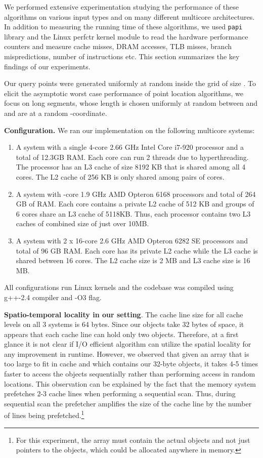 We performed extensive experimentation studying the performance of
these algorithms on various input types and on many different
multicore architectures. In addition to measuring the running time of
these algorithms, we used {\tt papi} library and the Linux perfctr kernel module to
read the hardware performance counters and measure cache misses, DRAM
accesses, TLB misses, branch mispredictions, number of instructions
etc. This section summarizes the key findings of
our experiments.

Our query points were generated uniformly at random inside the
grid of size . To elicit the
asymptotic worst case performance of point
location algorithms, we focus on long segments, whose length is chosen
uniformly at random between  and  and are at a random -coordinate.

\textbf{Configuration.} We ran our implementation on the following multicore systems:
\begin{enumerate}
\item
\label{item:intel}
A system with a single 4-core 2.66 GHz Intel Core i7-920 processor and a total
of 12.3GB RAM. Each core can run 2 threads due to hyperthreading. The
processor has an L3 cache of size 8192 KB that is shared
among all 4 cores. The L2 cache of 256 KB is only shared among pairs of cores.
\item
\label{item:amd}
A system with -core 1.9 GHz AMD Opteron 6168 processors 
and total of 264 GB of RAM.  Each core contains a private L2 cache of 512
KB and groups of 6 cores share an L3 cache of 5118KB. Thus, each processor
contains two L3 caches of combined size of just over 10MB.
\item
\label{item:bli}
A system with 2 x 16-core 2.6 GHz AMD Opteron 6282 SE processors and
total of 96 GB RAM. Each core has its private L2 cache while the L3
cache is shared between 16 cores. The L2 cache size is 2 MB and L3 cache size is 16 MB. 
\end{enumerate}

All configurations run Linux kernels and the codebase was
compiled using g++-2.4 compiler and -O3 flag.

\textbf{Spatio-temporal locality in our setting}.
The cache line size for all cache levels on all 3 systems is 64 bytes. Since our objects take 32 bytes
of space, it appears that each cache line can hold only two objects.
Therefore, at a first glance it is not clear if I/O efficient
algorithm can utilize the spatial locality for any improvement in runtime. However, we
observed that given an array that is too large to fit in cache and which contains
our 32-byte objects, it takes 4-5 times faster to access the objects
sequentially rather than performing access in random locations. This
observation can be explained by the fact that the memory system prefetches 2-3
cache lines when performing a sequential scan. Thus, during sequential scan the
prefetcher amplifies the size of the cache line by the number of lines being
prefetched.\footnote{For this experiment, the array must contain the actual
objects and not just pointers to the objects, which could be allocated anywhere
in memory.}

